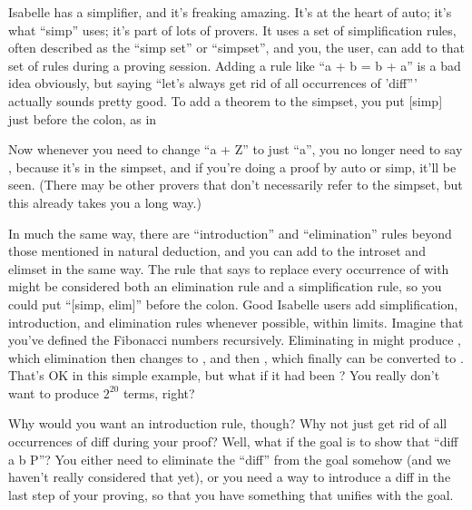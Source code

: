 Isabelle has a simplifier, and it's freaking amazing. It's at the heart of auto; it's what ``simp'' uses; it's part of lots of provers. It uses a set of simplification rules, often described as the ``simp set'' or ``simpset'', and you, the user, can add to that set of rules during a proving session. Adding a rule like ``a + b = b + a'' is a bad idea obviously, but saying ``let's always get rid of all occurrences of 'diff''' actually sounds pretty good. To add a theorem to the simpset, you put [simp] just before the colon, as in 


Now whenever you need to change ``a + Z'' to just ``a'', you no longer need to say , because it's in the simpset, and if you're doing a proof by auto or simp, it'll be seen. (There may be other provers that don't necessarily refer to the simpset, but this already takes you a long way.)

In much the same way, there are ``introduction'' and ``elimination'' rules beyond those mentioned in natural deduction, and you can add to the introset and elimset in the same way. The rule that says to replace every occurrence of  with  might be considered both an elimination rule and a simplification rule, so you could put ``[simp, elim]'' before the colon. Good Isabelle users add simplification, introduction, and elimination rules whenever possible, within limits. Imagine that you've defined the Fibonacci numbers recursively. Eliminating  in  might produce , which elimination then changes to , and then , which finally can be converted to . That's OK in this simple example, but what if it had been ? You really don't want to produce $2^20$ terms, right? 

Why would you want an introduction rule, though? Why not just get rid of all occurrences of diff during your proof? Well, what if the goal is to show that ``diff a b \in P''? You either need to eliminate the ``diff'' from the goal somehow (and we haven't really considered that yet), or you need a way to introduce a diff in the last step of your proving, so that you have something that unifies with the goal. 

